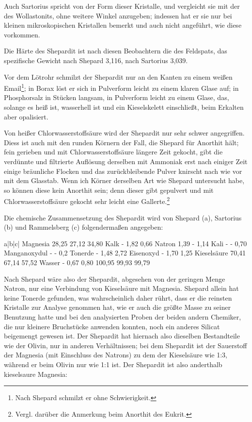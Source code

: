 \documentclass[a4paper, 11pt, oneside]{article}
\begin{document}
Auch Sartorius spricht von der Form dieser Kristalle, und vergleicht sie mit der des Wollastonits, ohne weitere Winkel anzugeben; indessen hat er sie nur bei kleinen mikroskopischen Kristallen bemerkt und auch nicht angeführt, wie diese vorkommen.

Die Härte des Shepardit ist nach diesen Beobachtern die des Feldspats, das spezifische Gewicht nach Shepard 3,116, nach Sartorius 3,039.

Vor dem Lötrohr schmilzt der Shepardit nur an den Kanten zu einem weißen Email\footnote{Nach Shepard schmilzt er ohne Schwierigkeit.}; in Borax löst er sich in Pulverform leicht zu einem klaren Glase auf; in Phosphorsalz in Stücken langsam, in Pulverform leicht zu einem Glase, das, solange es heiß ist, wasserhell ist und ein Kieselskelett einschließt, beim Erkalten aber opalisiert.

Von heißer Chlorwasserstoffsäure wird der Shepardit nur sehr schwer angegriffen. Diess ist auch mit den runden Körnern der Fall, die Shepard für Anorthit hält; fein gerieben und mit Chlorwasserstoffsäure längere Zeit gekocht, gibt die verdünnte und filtrierte Auflösung derselben mit Ammoniak erst nach einiger Zeit einige bräunliche Flocken und das zurückbleibende Pulver knirscht nach wie vor mit dem Glasstab. Wenn ich Körner derselben Art wie Shepard untersucht habe, so können diese kein Anorthit sein; denn dieser gibt gepulvert und mit Chlorwasserstoffsäure gekocht sehr leicht eine Gallerte.\footnote{Vergl. darüber die Anmerkung beim Anorthit des Eukrit.}

Die chemische Zusammensetzung des Shepardit wird von Shepard (a), Sartorius (b) und Rammelsberg (c) folgendermaßen angegeben:

a|b|c|  
Magnesia 28,25 27,12 34,80  
Kalk - 1,82 0,66  
Natron 1,39 - 1,14  
Kali - - 0,70  
Manganoxydul - - 0,2  
Tonerde - 1,48 2,72  
Eisenoxyd - 1,70 1,25  
Kieselsäure 70,41 67,14 57,52  
Wasser - 0,67 0,80  
100,95 99,93 99,79  

Nach Shepard wäre also der Shepardit, abgesehen von der geringen Menge Natron, nur eine Verbindung von Kieselsäure mit Magnesia. Shepard allein hat keine Tonerde gefunden, was wahrscheinlich daher rührt, dass er die reinsten Kristalle zur Analyse genommen hat, wie er auch die größte Masse zu seiner Benutzung hatte und bei den analysierten Proben der beiden andern Chemiker, die nur kleinere Bruchstücke anwenden konnten, noch ein anderes Silicat beigemengt gewesen ist. Der Shepardit hat hiernach also dieselben Bestandteile wie der Olivin, nur in anderen Verhältnissen; bei dem Shepardit ist der Sauerstoff der Magnesia (mit Einschluss des Natrons) zu dem der Kieselsäure wie 1:3, während er beim Olivin nur wie 1:1 ist. Der Shepardit ist also anderthalb kieselsaure Magnesia:
\end{document}
